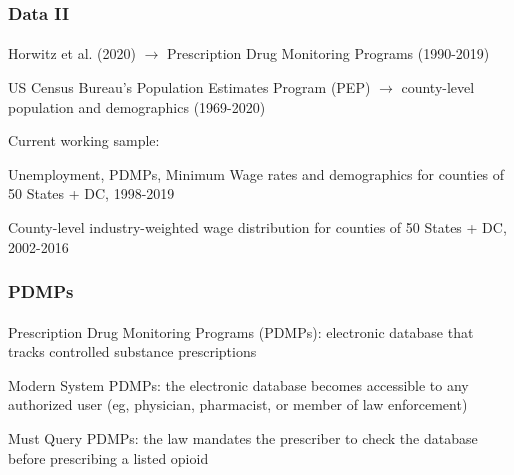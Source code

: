 \begin{frame}

    \frametitle{Data II} %
    \framesubtitle{}  %
    \rmfamily %

    \begin{wideitemize}
        \item \textcolor{fgre}{Horwitz et al. (2020)} \(\to\) Prescription Drug Monitoring Programs (1990-2019)
        \item \textcolor{fgre}{US Census Bureau's Population Estimates Program (PEP)} \(\to\) county-level population and demographics (1969-2020)
    \end{wideitemize}

    \vspace{9pt}
    Current working sample:
    \vspace{9pt}
    
    \begin{wideitemize}
        \item Unemployment, PDMPs, Minimum Wage rates and demographics for counties of 50 States + DC, 1998-2019
        \item County-level industry-weighted wage distribution for counties of 50 States + DC, 2002-2016
    \end{wideitemize}

\end{frame}


\begin{frame}

    \frametitle{PDMPs} %
    \framesubtitle{}  %
    \rmfamily %
    
    Prescription Drug Monitoring Programs (\textcolor{fblu}{PDMPs}): electronic database that tracks controlled substance prescriptions
    \vspace{9pt}

    \begin{wideenumerate}
        \item \textcolor{fblu}{Modern System PDMPs}: the electronic database becomes accessible to any authorized user (eg, physician, pharmacist, or member of law enforcement)
        \item \textcolor{fblu}{Must Query PDMPs}: the law mandates the prescriber to check the database before prescribing a listed opioid
    \end{wideenumerate}

    

\end{frame}